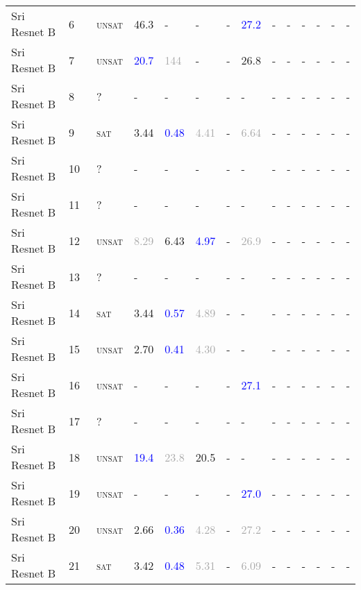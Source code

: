 \begin{center}
{\begin{longtable}{@{}llllllllllllll@{}}
Sri Resnet B & 6 & ~\textsc{unsat} & \textcolor{second}{46.3} & - & - & - & \textcolor{blue}{27.2} & - & - & - & - & - & - \\
Sri Resnet B & 7 & ~\textsc{unsat} & \textcolor{blue}{20.7} & \textcolor{darkgray}{144} & - & - & \textcolor{second}{26.8} & - & - & - & - & - & - \\
Sri Resnet B & 8 & ~? & - & - & - & - & - & - & - & - & - & - & - \\
Sri Resnet B & 9 & ~\textsc{sat} & \textcolor{second}{3.44} & \textcolor{blue}{0.48} & \textcolor{darkgray}{4.41} & - & \textcolor{darkgray}{6.64} & - & - & - & - & - & - \\
Sri Resnet B & 10 & ~? & - & - & - & - & - & - & - & - & - & - & - \\
Sri Resnet B & 11 & ~? & - & - & - & - & - & - & - & - & - & - & - \\
Sri Resnet B & 12 & ~\textsc{unsat} & \textcolor{darkgray}{8.29} & \textcolor{second}{6.43} & \textcolor{blue}{4.97} & - & \textcolor{darkgray}{26.9} & - & - & - & - & - & - \\
Sri Resnet B & 13 & ~? & - & - & - & - & - & - & - & - & - & - & - \\
Sri Resnet B & 14 & ~\textsc{sat} & \textcolor{second}{3.44} & \textcolor{blue}{0.57} & \textcolor{darkgray}{4.89} & - & - & - & - & - & - & - & - \\
Sri Resnet B & 15 & ~\textsc{unsat} & \textcolor{second}{2.70} & \textcolor{blue}{0.41} & \textcolor{darkgray}{4.30} & - & - & - & - & - & - & - & - \\
Sri Resnet B & 16 & ~\textsc{unsat} & - & - & - & - & \textcolor{blue}{27.1} & - & - & - & - & - & - \\
Sri Resnet B & 17 & ~? & - & - & - & - & - & - & - & - & - & - & - \\
Sri Resnet B & 18 & ~\textsc{unsat} & \textcolor{blue}{19.4} & \textcolor{darkgray}{23.8} & \textcolor{second}{20.5} & - & - & - & - & - & - & - & - \\
Sri Resnet B & 19 & ~\textsc{unsat} & - & - & - & - & \textcolor{blue}{27.0} & - & - & - & - & - & - \\
Sri Resnet B & 20 & ~\textsc{unsat} & \textcolor{second}{2.66} & \textcolor{blue}{0.36} & \textcolor{darkgray}{4.28} & - & \textcolor{darkgray}{27.2} & - & - & - & - & - & - \\
Sri Resnet B & 21 & ~\textsc{sat} & \textcolor{second}{3.42} & \textcolor{blue}{0.48} & \textcolor{darkgray}{5.31} & - & \textcolor{darkgray}{6.09} & - & - & - & - & - & - \\

\end{longtable}}
\end{center}
